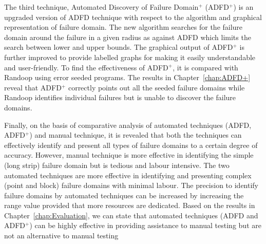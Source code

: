 The third technique, Automated Discovery of Failure Domain$^+$ (ADFD$^+$) is an upgraded version of ADFD technique with respect to the algorithm and graphical representation of failure domain. The new algorithm searches for the failure domain around the failure in a given radius as against ADFD which limits the search between lower and upper bounds. The graphical output of ADFD$^+$ is further improved to provide labelled graphs for making it easily understandable and user-friendly. To find the effectiveness of ADFD$^+$, it is compared with Randoop using error seeded programs. The results in Chapter~\ref{chap:ADFD+} reveal that ADFD$^+$ correctly points out all the seeded failure domains while Randoop identifies individual failures but is unable to discover the failure domains. 

Finally, on the basis of comparative analysis of automated techniques (ADFD, ADFD$^+$) and manual technique, it is revealed that both the techniques can effectively identify and present all types of failure domains to a certain degree of accuracy. However, manual technique is more effective in identifying the simple (long strip) failure domain but is tedious and labour intensive. The two automated techniques are more effective in identifying and presenting complex (point and block) failure domains with minimal labour. The precision to identify failure domains by automated techniques can be increased by increasing the range value provided that more resources are dedicated. Based on the results in Chapter~\ref{chap:Evaluation}, we can state that automated techniques (ADFD and ADFD$^+$) can be highly effective in providing assistance to manual testing but are not an alternative to manual testing

\bigskip





